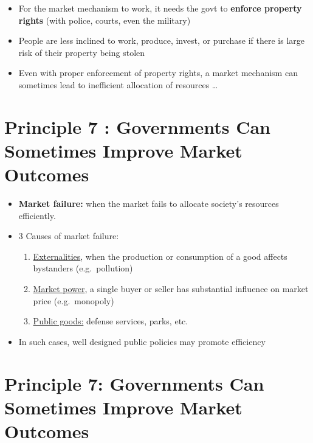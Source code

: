 \documentclass[
]{book}
\begin{document}
\begin{itemize}
\item
  For the market mechanism to work, it needs the govt to \textbf{enforce property rights} (with police, courts, even the military)
\item
  People are less inclined to work, produce, invest, or purchase if there is large risk of their property being stolen
\item
  Even with proper enforcement of property rights, a market mechanism can sometimes lead to inefficient allocation of resources \ldots
\end{itemize}

\hypertarget{principle-7-governments-can-sometimes-improve-market-outcomes}{%
\section{Principle 7 : Governments Can Sometimes Improve Market Outcomes}\label{principle-7-governments-can-sometimes-improve-market-outcomes}}

\begin{itemize}
\item
  \textbf{Market failure:} when the market fails to allocate society's resources efficiently.
\item
  3 Causes of market failure:

  \begin{enumerate}
  \def\labelenumi{\arabic{enumi}.}
  \item
    \underline{Externalities}, when the production or consumption of a good affects bystanders (e.g.~pollution)
  \item
    \underline{Market power}, a single buyer or seller has substantial influence on market price (e.g.~monopoly)
  \item
    \underline{Public goods:} defense services, parks, etc.
  \end{enumerate}
\item
  In such cases, well designed public policies may promote efficiency
\end{itemize}

\hypertarget{principle-7-governments-can-sometimes-improve-market-outcomes-1}{%
\section{Principle 7: Governments Can Sometimes Improve Market Outcomes}\label{principle-7-governments-can-sometimes-improve-market-outcomes-1}}
\end{document}
